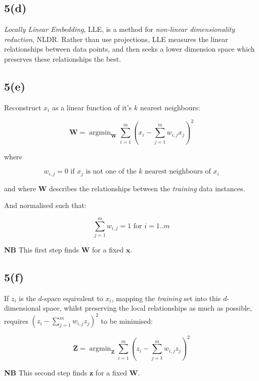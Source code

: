 \documentclass[12pt, a4paper,reqno]{article}
\DeclareMathOperator*{\argmin}{argmin}
\begin{document}
\subsection*{5(d)}
\emph{Locally Linear Embedding}, LLE, is a method for \emph{non-linear dimensionality reduction}, NLDR. Rather than use projections, LLE measures the linear relationships between data points, and then seeks a lower dimension space which preserves these relationships the best. 

\subsection*{5(e)}

Reconstruct $x_i$ as a linear function of it's $k$ nearest neighbours:

\begin{equation}
\mathbf{W} = \argmin_{\mathbf{W}}\sum_{i=1}^{m}\left(x_i - \sum_{j=1}^{m} w_{i, j}x_j\right)^2
\end{equation}

where

\begin{equation}
w_{i,j} = 0\text{ if $x_j$ is not one of the $k$ nearest neighbours of $x_i$}
\end{equation}

and where $\mathbf{W}$ describes the relationships between the \emph{training} data instances.

And normalised such that:

\begin{equation}
\sum_{j=1}^m w_{i, j} = 1\text{ for } i = 1..m
\end{equation}

\textbf{NB} This first step finds $\mathbf{W}$ for a fixed $\mathbf{x}$.

\subsection*{5(f)}

If $z_i$ is the $d$-space equivalent to $x_i$, mapping the \emph{training} set into this $d$-dimensional space, whilst preserving the local relationships as much as possible, requires $\left(z_i - \sum_{j=1}^m w_{i, j} z_j\right)^2$ to be minimised:

\begin{equation}
\mathbf{Z} = \argmin_{\mathbf{Z}}\sum_{i=1}^{m}\left(z_i - \sum_{j=1}^{m} w_{i, j}z_j\right)^2
\end{equation}

\textbf{NB} This second step finds $\mathbf{z}$ for a fixed $\mathbf{W}$.
\end{document}
